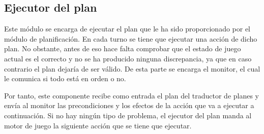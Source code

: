 \subsection{Ejecutor del plan}

Este módulo se encarga de ejecutar el plan que le ha sido proporcionado por el módulo de planificación.
En cada turno se tiene que ejecutar una acción de dicho plan. No obstante, antes de eso hace falta
comprobar que el estado de juego actual es el correcto y no se ha producido ninguna discrepancia, ya
que en caso contrario el plan dejaría de ser válido. De esta parte se encarga el monitor, el cual
le comunica si todo está en orden o no.

Por tanto, este componente recibe como entrada el plan del traductor de planes y envía al monitor
las precondiciones y los efectos de la acción que va a ejecutar a continuación. Si no hay ningún
tipo de problema, el ejecutor del plan manda al motor de juego la siguiente acción que se
tiene que ejecutar.
